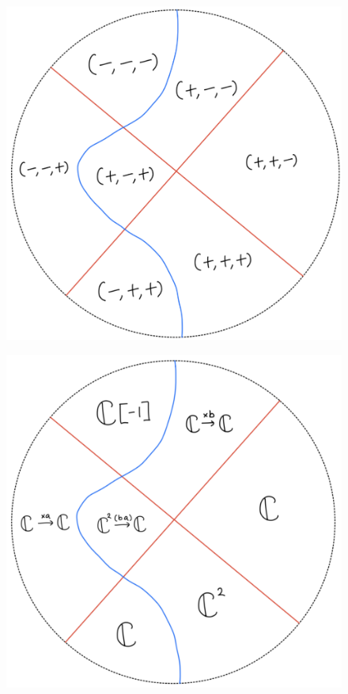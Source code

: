 \begin{figure}[H]
    \centering
    \includegraphics[scale = 0.95]{diagrams/lemma4/26.png}
    \caption{}
    \label{fig:your-label}
\end{figure}
\begin{figure}[H]
    \centering
    \includegraphics[scale = 0.95]{diagrams/lemma4/27.png}
    \caption{}
    \label{fig:your-label}
\end{figure}
